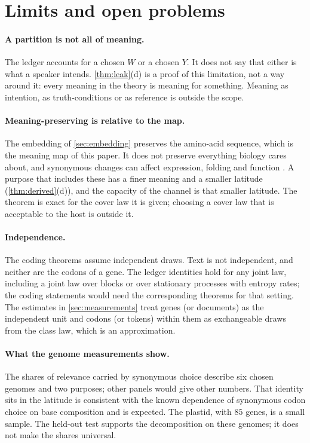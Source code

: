 \section{Limits and open problems}\label{sec:limits}
\paragraph{A partition is not all of meaning.} The ledger accounts for a chosen $W$ or a chosen $Y$. It does not say that either is what a speaker intends. \cref{thm:leak}(d) is a proof of this limitation, not a way around it: every meaning in the theory is meaning for something. Meaning as intention, as truth-conditions or as reference is outside the scope.

\paragraph{Meaning-preserving is relative to the map.} The embedding of \cref{sec:embedding} preserves the amino-acid sequence, which is the meaning map of this paper. It does not preserve everything biology cares about, and synonymous changes can affect expression, folding and function \citep{plotkin2011,kimchi2007}. A purpose that includes these has a finer meaning and a smaller latitude (\cref{thm:derived}(d)), and the capacity of the channel is that smaller latitude. The theorem is exact for the cover law it is given; choosing a cover law that is acceptable to the host is outside it.

\paragraph{Independence.} The coding theorems assume independent draws. Text is not independent, and neither are the codons of a gene. The ledger identities hold for any joint law, including a joint law over blocks or over stationary processes with entropy rates; the coding statements would need the corresponding theorems for that setting. The estimates in \cref{sec:measurements} treat genes (or documents) as the independent unit and codons (or tokens) within them as exchangeable draws from the class law, which is an approximation.

\paragraph{What the genome measurements show.} The shares of relevance carried by synonymous choice describe six chosen genomes and two purposes; other panels would give other numbers. That identity sits in the latitude is consistent with the known dependence of synonymous codon choice on base composition \citep{sueoka1962,muto1987} and is expected. The plastid, with $85$ genes, is a small sample. The held-out test supports the decomposition on these genomes; it does not make the shares universal.

